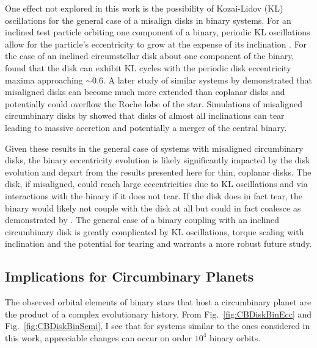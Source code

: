 One effect not explored in this work is the possibility of Kozai-Lidov (KL) oscillations for the general case of a misalign disks in binary systems.   
For an inclined test particle orbiting one component of a binary, periodic KL oscillations 
allow for the particle's eccentricity to grow at the expense of its inclination \citet{Kozai1962,Lidov1962}.  For the case of an inclined circumstellar disk about one 
component of the binary, \citet{Martin2014CB} found that the disk can exhibit KL cycles with the periodic disk eccentricity maxima approaching $\sim 0.6$.  A 
later study of similar systems by \citet{Lubow2015} demonstrated that misaligned disks can become much more extended than coplanar disks and 
potentially could overflow the Roche lobe of the star.  Simulations of misaligned circumbinary disks by \citet{Nixon2013} showed that disks of almost all 
inclinations can tear leading to massive accretion and potentially a merger of the central binary.

Given these results in the general case of systems with 
misaligned circumbinary disks, the binary eccentricity evolution is likely significantly impacted by the disk evolution and depart from the results presented here 
for thin, coplanar disks.  The disk, if misaligned, could reach large eccentricities due to KL oscillations and via interactions with the binary if it does not tear.  If 
the disk does in fact tear, the binary would likely not couple with the disk at all but could in fact coalesce as demonstrated by \citet{Nixon2013}.  The general 
case of a binary coupling with an inclined circumbinary disk is greatly complicated by KL oscillations, torque scaling with inclination and the potential for tearing 
and warrants a more robust future study.

\subsection{Implications for Circumbinary Planets} \label{CBDisk:sec:cbp_implications}

The observed orbital elements of binary stars that host a circumbinary planet are the product of a complex evolutionary history.  From Fig.~\ref{fig:CBDiskBinEcc} and 
Fig.~\ref{fig:CBDiskBinSemi}, I see that for systems similar to the ones considered in this work, appreciable changes can occur on order $10^4$ binary orbits.  

